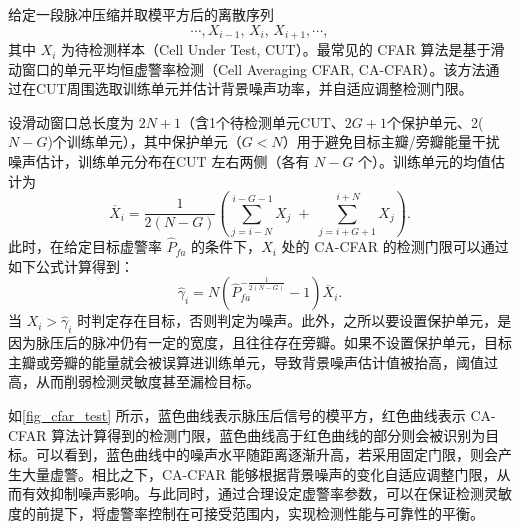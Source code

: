 给定一段脉冲压缩并取模平方后的离散序列
\[
    \cdots, X_{i-1},\, X_i,\, X_{i+1}, \cdots ,
\]
其中 \(X_i\) 为待检测样本（Cell Under Test, CUT）。最常见的 CFAR 算法是基于滑动窗口的单元平均恒虚警率检测（Cell Averaging CFAR, CA-CFAR）。该方法通过在CUT周围选取训练单元并估计背景噪声功率，并自适应调整检测门限。

设滑动窗口总长度为 \(2N+1\)（含1个待检测单元CUT、\(2G+1\)个保护单元、2(\(N-G\))个训练单元），其中保护单元（\(G<N\)）用于避免目标主瓣/旁瓣能量干扰噪声估计，训练单元分布在CUT 左右两侧（各有 \(N-G\) 个）。训练单元的均值估计为
\[
    \overline{X}_i = \frac{1}{2(N-G)}
    \left( \sum_{j=i-N}^{\,i-G-1} X_j \;+\; \sum_{j=i+G+1}^{\,i+N} X_j \right).
\]
此时，在给定目标虚警率 \(\hat{P}_{fa}\) 的条件下，\( X_i \) 处的 CA-CFAR 的检测门限可以通过如下公式计算得到：
\[
    \hat{\gamma}_i = N\left(\hat{P}_{fa}^{-\frac{1}{2(N-G)}}-1\right)\overline{X}_i.
\]
当 \(X_i > \hat{\gamma}_i\) 时判定存在目标，否则判定为噪声。此外，之所以要设置保护单元，是因为脉压后的脉冲仍有一定的宽度，且往往存在旁瓣。如果不设置保护单元，目标主瓣或旁瓣的能量就会被误算进训练单元，导致背景噪声估计值被抬高，阈值过高，从而削弱检测灵敏度甚至漏检目标。

如\cref{fig_cfar_test} 所示，蓝色曲线表示脉压后信号的模平方，红色曲线表示 CA-CFAR 算法计算得到的检测门限，蓝色曲线高于红色曲线的部分则会被识别为目标。可以看到，蓝色曲线中的噪声水平随距离逐渐升高，若采用固定门限，则会产生大量虚警。相比之下，CA-CFAR 能够根据背景噪声的变化自适应调整门限，从而有效抑制噪声影响。与此同时，通过合理设定虚警率参数，可以在保证检测灵敏度的前提下，将虚警率控制在可接受范围内，实现检测性能与可靠性的平衡。

